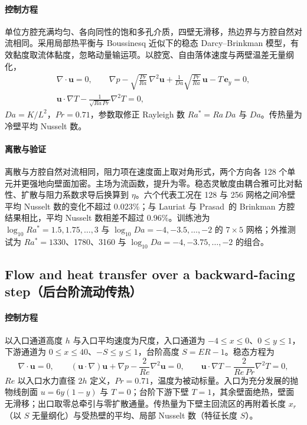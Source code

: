 \paragraph{控制方程}
单位方腔充满均匀、各向同性的饱和多孔介质，四壁无滑移，热边界与方腔自然对流相同。采用局部热平衡与 Boussinesq 近似下的稳态 Darcy--Brinkman 模型，有效黏度取流体黏度，忽略动量输运项。以腔宽、自由落体速度与两壁温差无量纲化，
\begin{equation}
\begin{gathered}
\nabla\cdot\mathbf u=0,\qquad
\nabla p-\sqrt{\frac{Pr}{Ra}}\,\nabla^2\mathbf u+\frac{1}{Da}\sqrt{\frac{Pr}{Ra}}\,\mathbf u-T\,\mathbf e_y=0,\\
\mathbf u\cdot\nabla T-\frac{1}{\sqrt{Ra\,Pr}}\nabla^2T=0,
\end{gathered}
\end{equation}
$Da=K/L^2$，$Pr=0.71$，参数取修正 Rayleigh 数 $Ra^\ast=Ra\,Da$ 与 $Da$。传热量为冷壁平均 Nusselt 数。

\paragraph{离散与验证}
离散与方腔自然对流相同，阻力项在速度面上取对角形式，两个方向各 128 个单元并更强地向壁面加密。主场为流函数，提升为零。稳态灵敏度由耦合雅可比对黏性、扩散与阻力系数求导后换算到 $\eta$。六个代表工况在 128 与 256 网格之间冷壁平均 Nusselt 数的变化不超过 0.023\%；与 Lauriat 与 Prasad~\cite{lauriat1987natural}的 Brinkman 方腔结果相比，平均 Nusselt 数相差不超过 0.96\%。训练池为 $\log_{10}Ra^\ast=1.5,1.75,\ldots,3$ 与 $\log_{10}Da=-4,-3.5,\ldots,-2$ 的 $7\times5$ 网格；外推测试为 $Ra^\ast=1330$、1780、3160 与 $\log_{10}Da=-4,-3.75,\ldots,-2$ 的组合。

\subsection{Flow and heat transfer over a backward-facing step（后台阶流动传热）}
\label{app:bfs}

\paragraph{控制方程}
以入口通道高度 $h$ 与入口平均速度为尺度，入口通道为 $-4\le x\le0$、$0\le y\le1$，下游通道为 $0\le x\le40$、$-S\le y\le1$，台阶高度 $S=ER-1$。稳态方程为
\begin{equation}
\nabla\cdot\mathbf u=0,\qquad
(\mathbf u\cdot\nabla)\mathbf u+\nabla p-\frac{2}{Re}\nabla^2\mathbf u=0,\qquad
\mathbf u\cdot\nabla T-\frac{2}{Re\,Pr}\nabla^2T=0,
\end{equation}
$Re$ 以入口水力直径 $2h$ 定义，$Pr=0.71$，温度为被动标量。入口为充分发展的抛物线剖面 $u=6y(1-y)$ 与 $T=0$；台阶下游下壁 $T=1$，其余壁面绝热，壁面无滑移；出口取零总牵引与零扩散通量。传热量为下壁主回流区的再附着长度 $x_r$（以 $S$ 无量纲化）与受热壁的平均、局部 Nusselt 数（特征长度 $S$）。

